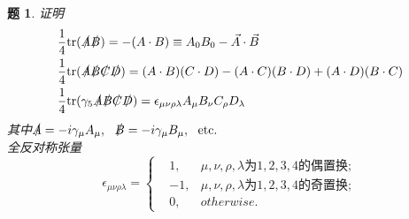 \documentclass[UTF8,10pt,a4paper]{article}
\theoremstyle{Problem}%
\newtheorem{prob}{题}%
\theoremstyle{Solution}%
\begin{document}
\thispagestyle{FirstPageStyle}%
\begin{prob}
证明
\[
    \begin{aligned}
        &\frac{1}{4} \text{tr}(\slashed{A}\slashed{B}) = -(A\cdot B) \equiv A_0B_0 - \vec{A} \cdot \vec{B} \\
        &\frac{1}{4}\text{tr}(\slashed{A}\slashed{B}\slashed{C}\slashed{D}) = (A\cdot B)(C \cdot D) - (A\cdot C)(B \cdot D) + (A \cdot D)(B \cdot C) \\
        &\frac{1}{4}\text{tr}(\gamma_5\slashed{A}\slashed{B}\slashed{C}\slashed{D}) = \epsilon_{\mu\nu\rho\lambda} A_{\mu}B_{\nu} C_{\rho} D_{\lambda}
    \end{aligned}
\]
其中$\slashed{A} = -i\gamma_\mu A_{\mu}, ~~ \slashed{B} = -i\gamma_\mu B_\mu, ~~ \text{etc.}$ \\ 
全反对称张量
\[
    \epsilon_{\mu\nu\rho\lambda} = \left\{ 
        \begin{aligned}
            &1, &\mu,\nu,\rho,\lambda \text{为}1,2,3,4\text{的偶置换}; \\
            &-1, &\mu,\nu,\rho,\lambda \text{为}1,2,3,4\text{的奇置换}; \\
            &0, &otherwise.
        \end{aligned}
    \right.
\]
\end{prob}
\end{document}
